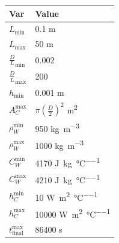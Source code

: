 \documentclass[12pt]{article}
\begin{document}
\begin{table}[!h]
\caption{Specification Parameter Values} \label{TblSpecParams}
\renewcommand{\arraystretch}{1.2}
\noindent \begin{longtable*}{l l} 
  \toprule
  \textbf{Var} & \textbf{Value} \\
  \midrule 
  $L_\text{min}$ & 0.1 \si{\metre}\\
  $L_\text{max}$ & 50 \si{\metre}\\
  ${\frac{D}{L}}_\text{min}$ & 0.002 \\
  ${\frac{D}{L}}_\text{max}$ & 200 \\
  $h_\text{min}$ & 0.001 \si{\metre}\\
  $A_C^{\text{max}}$ & $\pi(\frac{D}{2})^2$ \si{\square\metre}\\
  $\rho_W^{\text{min}}$ & 950 \si{\kilo\gram\per\cubic\metre}\\
  $\rho_W^{\text{max}}$ & 1000 \si{\kilo\gram\per\cubic\metre}\\
  $C_W^{\text{min}}$ & 4170 \si{\joule\per\kilo\gram\per\celsius}\\
  $C_W^{\text{max}}$ & 4210 \si{\joule\per\kilo\gram\per\celsius}\\
  $h_C^{\text{min}}$ & 10 \si{\watt\per\square\metre\per\celsius}\\
  $h_C^{\text{max}}$ & 10000 \si{\watt\per\square\metre\per\celsius}\\
  $t_{\text{final}}^{\text{max}}$ & 86400 \si{\second}\\
  
  \bottomrule
\end{longtable*}
\end{table}
\end{document}
